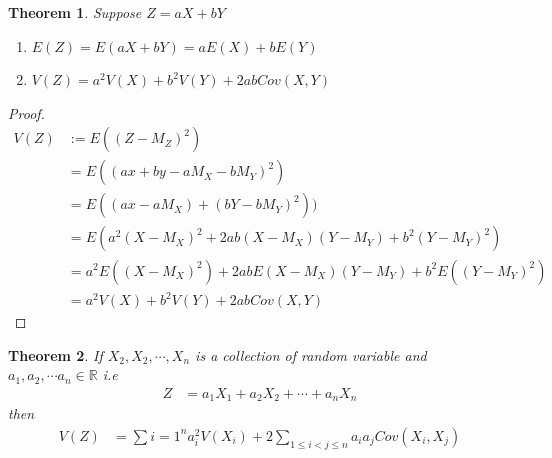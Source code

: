 \documentclass[11pt,oneside]{book}
\theoremstyle{break}
\theoremstyle{break}
\newtheorem{thm}{Theorem}[section]
\newcommand{\R}{\mathbb{R}}
\begin{document}
\begin{thm}
Suppose $Z=aX+bY$\begin{enumerate}
\item $E(Z)=E(aX+bY)=aE(X)+bE(Y)$
\item $V(Z)=a^2V(X)+b^2V(Y)+2abCov(X,Y)$ 
\end{enumerate}
\end{thm}
\begin{proof}
\begin{align*}
V(Z)&:=E((Z-M_Z)^2)\\
&=E((ax+by-aM_X-bM_Y)^2)\\
&=E((ax-aM_X)+(bY-bM_Y)^2))\\
&=E(a^2(X-M_X)^2+2ab(X-M_X)(Y-M_Y)+b^2(Y-M_Y)^2)\\
&=a^2E((X-M_X)^2)+2abE(X-M_X)(Y-M_Y)+b^2E((Y-M_Y)^2)\\
&=a^2V(X)+b^2V(Y)+2abCov(X,Y)
\end{align*}
\end{proof}
\begin{thm}
If $X_2,X_2,\cdots,X_n$ is a collection of random variable and $a_1,a_2,\cdots a_n\in \R$ i.e \begin{align*}
Z&=a_1X_1+a_2X_2+\cdots +a_nX_n
\end{align*}
then \begin{align*}
V(Z)&=\sum{i=1}^{n}a_i^2V(X_i)+2\sum_{1\leq i<j\leq n}a_ia_jCov(X_i,X_j)
\end{align*}
\end{thm}
\end{document}
